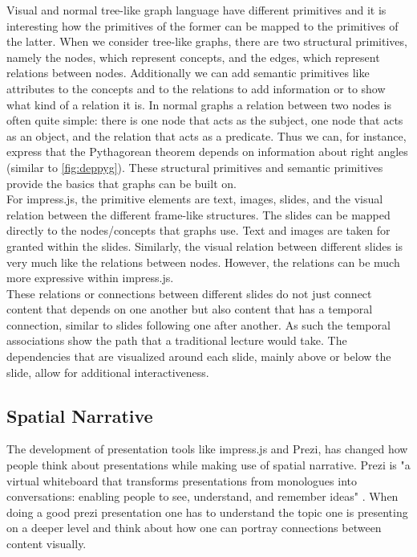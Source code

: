 \documentclass[twoside, 12pt]{article}
\begin{document}
Visual and normal tree-like graph language have different primitives and it is interesting how the primitives of the former can be mapped to the primitives of the latter. When we consider tree-like graphs, there are two structural primitives, namely the nodes, which represent concepts, and the edges, which represent relations between nodes. Additionally we can add semantic primitives like attributes to the concepts and to the relations to add information or to show what kind of a relation it is. In normal graphs a relation between two nodes is often quite simple: there is one node that acts as the subject, one node that acts as an object, and the relation that acts as a predicate. Thus we can, for instance, express that the Pythagorean theorem depends on information about right angles (similar to \autoref{fig:deppyg}). These structural primitives and semantic primitives provide the basics that graphs can be built on.\\

For impress.js, the primitive elements are text, images, slides, and the visual relation between the different frame-like structures. The slides can be mapped directly to the nodes/concepts that graphs use. Text and images are taken for granted within the slides. Similarly, the visual relation between different slides is very much like the relations between nodes. However, the relations can be much more expressive within impress.js.\\

These relations or connections between different slides do not just connect content that depends on one another but also content that has a temporal connection, similar to slides following one after another. As such the temporal associations show the path that a traditional lecture would take. The dependencies that are visualized around each slide, mainly above or below the slide, allow for additional interactiveness.\\

\subsection{Spatial Narrative}
\label{sec:spatialnarrative}

The development of presentation tools like impress.js and Prezi, has changed how people think about presentations while making use of spatial narrative. Prezi is "a virtual whiteboard that transforms presentations from monologues into conversations: enabling people to see, understand, and remember ideas" \cite{Prezi:npentrel14}. When doing a good prezi presentation one has to understand the topic one is presenting on a deeper level and think about how one can portray connections between content visually.\\
\end{document}
